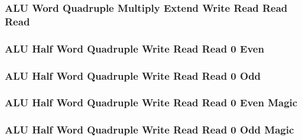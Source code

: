 

\subsubsection[{\small ALU Word Quadruple Multiply Extend Write Read Read Read}]{ALU Word Quadruple Multiply Extend Write Read Read Read} \label{sec:format-ALU-WQMXWRRR}



\subsubsection[{\small ALU Half Word Quadruple Write Read Read 0 Even}]{ALU Half Word Quadruple Write Read Read 0 Even} \label{sec:format-ALU-HQWRR0E}



\subsubsection[{\small ALU Half Word Quadruple Write Read Read 0 Odd}]{ALU Half Word Quadruple Write Read Read 0 Odd} \label{sec:format-ALU-HQWRR0O}



\subsubsection[{\small ALU Half Word Quadruple Write Read Read 0 Even Magic}]{ALU Half Word Quadruple Write Read Read 0 Even Magic} \label{sec:format-ALU-HQWRR0E.M}



\subsubsection[{\small ALU Half Word Quadruple Write Read Read 0 Odd Magic}]{ALU Half Word Quadruple Write Read Read 0 Odd Magic} \label{sec:format-ALU-HQWRR0O.M}

